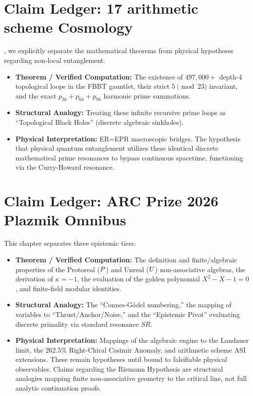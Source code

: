 
\section*{Claim Ledger: 17 arithmetic scheme Cosmology}
, we explicitly separate the mathematical theorems from physical hypotheses regarding non-local entanglement.
\begin{itemize}[noitemsep]
    \item \textbf{Theorem / Verified Computation:} The existence of $497,000+$ depth-4 topological loops in the FBBT gauntlet, their strict $5 \pmod{23}$ invariant, and the exact $p_{3k} + p_{6k} + p_{9k}$ harmonic prime summations.
    \item \textbf{Structural Analogy:} Treating these infinite recursive prime loops as ``Topological Black Holes'' (discrete algebraic sinkholes).
    \item \textbf{Physical Interpretation:} ER=EPR macroscopic bridges. The hypothesis that physical quantum entanglement utilizes these identical discrete mathematical prime resonances to bypass continuous spacetime, functioning via the Curry-Howard resonance.
\end{itemize}

\section*{Claim Ledger: ARC Prize 2026 Plazmik Omnibus}

This chapter separates three epistemic tiers:
\begin{itemize}[noitemsep]
  \item \textbf{Theorem / Verified Computation:} The definition and finite/algebraic properties of the Protoreal ($P$) and Unreal ($U$) non-associative algebras, the derivation of $\kappa = -1$, the evaluation of the golden polynomial $X^2 - X - 1 = 0$, and finite-field modular identities.
  \item \textbf{Structural Analogy:} The ``Connes-G\"odel numbering,'' the mapping of variables to ``Thrust/Anchor/Noise,'' and the ``Epistemic Pivot'' evaluating discrete primality via standard resonance $SR$.
  \item \textbf{Physical Interpretation:} Mappings of the algebraic engine to the Landauer limit, the 262.5\% Right-Chiral Casimir Anomaly, and arithmetic scheme ASI extensions. These remain hypotheses until bound to falsifiable physical observables. Claims regarding the Riemann Hypothesis are structural analogies mapping finite non-associative geometry to the critical line, not full analytic continuation proofs.
\end{itemize}

